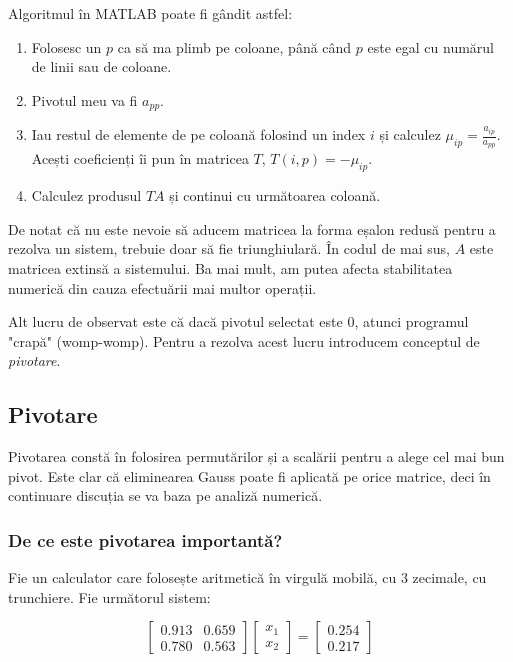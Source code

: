 \documentclass{exam}
\newcommand{\octavescript}[2]{
	
}
\begin{document}
\par Algoritmul în MATLAB poate fi gândit astfel:

\begin{enumerate}
	\item Folosesc un $p$ ca să ma plimb pe coloane, până când $p$ este egal
	      cu numărul de linii sau de coloane.
	\item Pivotul meu va fi $a_{pp}$.
	\item Iau restul de elemente de pe coloană folosind un index $i$ și calculez
	      $\mu_{ip} = \frac{a_{ip}}{a_{pp}}$. Acești coeficienți îi pun în
	      matricea $T$, $T(i, p) = -\mu_{ip}$.
	\item Calculez produsul $TA$ și continui cu următoarea coloană.
\end{enumerate}

\newpage
\octavescript{./src/G.m}{}

\par De notat că nu este nevoie să aducem matricea la forma eșalon redusă pentru
a rezolva un sistem, trebuie doar să fie triunghiulară. În codul de mai sus, $A$
este matricea extinsă a sistemului. Ba mai mult, am putea afecta stabilitatea
numerică din cauza efectuării mai multor operații.

\par Alt lucru de observat este că dacă pivotul selectat este 0, atunci
programul "crapă" (womp-womp). Pentru a rezolva acest lucru introducem
conceptul de \textit{pivotare}.

\subsection{Pivotare}

\par Pivotarea constă în folosirea permutărilor și a scalării pentru a alege
cel mai bun pivot. Este clar că eliminearea Gauss poate fi aplicată pe orice
matrice, deci în continuare discuția se va baza pe analiză numerică.

\subsubsection{De ce este pivotarea importantă?}

\par Fie un calculator care folosește aritmetică în virgulă mobilă, cu 3
zecimale, cu trunchiere. Fie următorul sistem:

\begin{equation*}
	\begin{bmatrix}
		0.913 & 0.659 \\
		0.780 & 0.563
	\end{bmatrix}
	\begin{bmatrix}
		x_1 \\
		x_2
	\end{bmatrix}
	=
	\begin{bmatrix}
		0.254 \\
		0.217
	\end{bmatrix}
\end{equation*}
\end{document}
